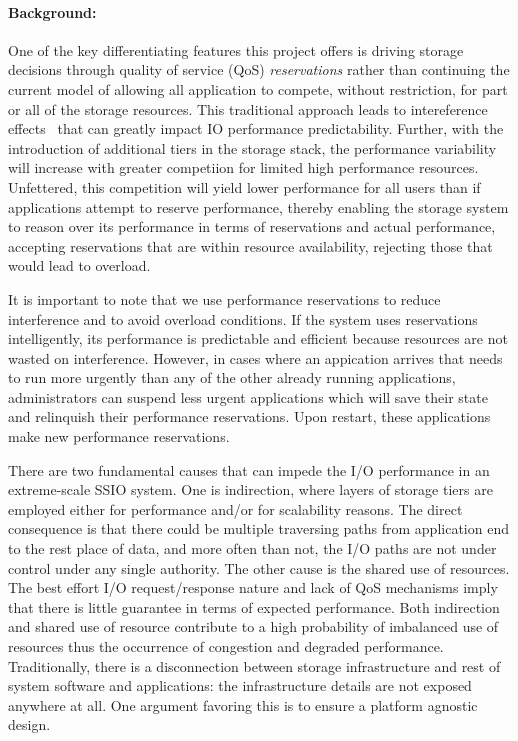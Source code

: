 \paragraph{Background:} One of the key differentiating features this project offers is driving storage
decisions through quality of service (QoS) \emph{reservations} rather than continuing the current model of allowing
all application to compete, without restriction, for part or all of the storage
resources. This traditional approach leads to intereference
effects~\cite{lofstead:2010:adaptive,liu_hotstorage} that can greatly impact IO performance
predictability. Further, with the introduction of additional tiers in the
storage stack, the performance variability will increase with greater
competiion for limited high performance resources. Unfettered, this competition
will yield lower performance for all users than if applications
attempt to reserve performance, thereby enabling the storage system
to reason over its performance in terms of reservations and actual
performance, accepting reservations that are within resource
availability, rejecting those that would lead to overload.

It is important to note that we use performance reservations to
reduce interference and to avoid overload conditions. If the system
uses reservations intelligently, its performance is predictable and
efficient because resources are not wasted on interference. However,
in cases where an appication arrives that needs to run more urgently
than any of the other already running applications, administrators
can suspend less urgent applications which will save their state
and relinquish their performance reservations. Upon restart, these
applications make new performance reservations.

There are two fundamental causes that can impede the I/O performance
in an extreme-scale SSIO system. One is indirection, where layers
of storage tiers are employed either for performance and/or for
scalability reasons.  The direct consequence is that there could
be multiple traversing paths from application end to the rest place
of data, and more often than not, the I/O paths are not under control
under any single authority. The other cause is the shared use of
resources. The best effort I/O request/response nature and lack of
QoS mechanisms imply that there is little guarantee in terms of
expected performance.  Both indirection and shared use of resource
contribute to a high probability of imbalanced use of resources
thus the occurrence of congestion and degraded performance.
Traditionally, there is a disconnection between storage infrastructure
and rest of system software and applications: the infrastructure
details are not exposed anywhere at all. One argument favoring this
is to ensure a platform agnostic design.

